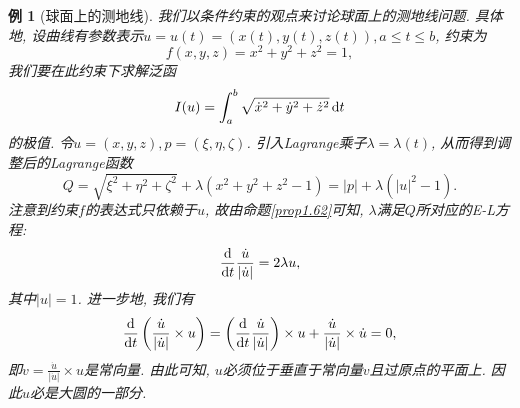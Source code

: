 \documentclass[12pt,a4paper]{article}
\newtheorem{example}[theorem]{例}
\begin{document}
\begin{example}[球面上的测地线]
    我们以条件约束的观点来讨论球面上的测地线问题. 具体地, 设曲线有参数表示$u= u(t) = (x(t), y(t), z(t)), a \leq t \leq b$, 约束为 
    \begin{equation*}
        f(x, y, z) = x^2 + y^2 + z^2 = 1,
    \end{equation*}
    我们要在此约束下求解泛函 
    \begin{equation*}
        I(u) = \int_a^b \sqrt{\dot x^2 + \dot y^2 + \dot z^2} \,{\rm d}t
    \end{equation*}
    的极值. 令$u = (x, y, z), p = (\xi, \eta, \zeta)$. 引入Lagrange乘子$\lambda = \lambda(t)$, 从而得到调整后的Lagrange函数 
    \begin{equation*}
        Q = \sqrt{\xi^2 + \eta^2 + \zeta^2} + \lambda(x^2 + y^2 + z^2 - 1) = |p| + \lambda(|u|^2 - 1).
    \end{equation*}
    注意到约束$f$的表达式只依赖于$u$, 故由命题\eqref{prop1.62}可知, $\lambda$满足$Q$所对应的E-L方程:
    \begin{equation*}
        \frac{{\rm d}}{{\rm d}t}\frac{\dot u}{|\dot u|} = 2\lambda u,
    \end{equation*}
    其中$|u| = 1$. 进一步地, 我们有
    \begin{equation*}
        \frac{{\rm d}}{{\rm d}t}\left(\frac{\dot u}{|\dot u|} \times u\right) = \left(\frac{{\rm d}}{{\rm d}t}\frac{\dot u}{|\dot u|}\right) \times u + \frac{\dot u}{|\dot u|} \times \dot u = 0,
    \end{equation*}
    即$v= \frac{\dot u}{|\dot u|} \times u$是常向量. 由此可知, $u$必须位于垂直于常向量$v$且过原点的平面上.
    因此$u$必是大圆的一部分.
\end{example}
\end{document}

